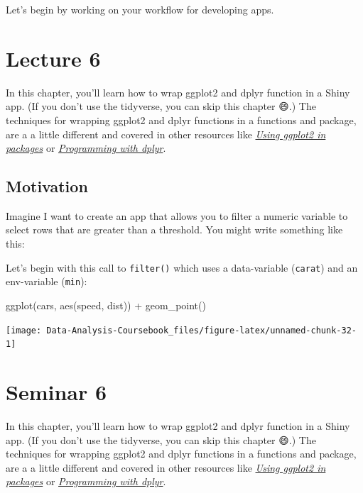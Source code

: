 \documentclass[
]{article}
\newenvironment{Shaded}{\begin{snugshade}}{\end{snugshade}}
\newcommand{\FunctionTok}[1]{\textcolor[rgb]{0.00,0.00,0.00}{#1}}
\newcommand{\NormalTok}[1]{#1}
\newcommand{\SpecialCharTok}[1]{\textcolor[rgb]{0.00,0.00,0.00}{#1}}
\begin{document}
Let's begin by working on your workflow for developing apps.

\hypertarget{lecture6}{%
\section{Lecture 6}\label{lecture6}}

In this chapter, you'll learn how to wrap ggplot2 and dplyr function in a Shiny app.
(If you don't use the tidyverse, you can skip this chapter 😄.) The techniques for wrapping ggplot2 and dplyr functions in a functions and package, are a a little different and covered in other resources like \href{http://ggplot2.tidyverse.org/dev/articles/ggplot2-in-packages.html}{\emph{Using ggplot2 in packages}} or \href{http://dplyr.tidyverse.org/articles/programming.html}{\emph{Programming with dplyr}}.

\hypertarget{tidy-motivation}{%
\subsection{Motivation}\label{tidy-motivation}}

Imagine I want to create an app that allows you to filter a numeric variable to select rows that are greater than a threshold.
You might write something like this:

Let's begin with this call to \texttt{filter()} which uses a data-variable (\texttt{carat}) and an env-variable (\texttt{min}):

\begin{Shaded}
\begin{Highlighting}[]
\FunctionTok{ggplot}\NormalTok{(cars, }\FunctionTok{aes}\NormalTok{(speed, dist)) }\SpecialCharTok{+} 
  \FunctionTok{geom\_point}\NormalTok{()}
\end{Highlighting}
\end{Shaded}

\begin{center}\texttt{[image: Data-Analysis-Coursebook\_files/figure-latex/unnamed-chunk-32-1]} \end{center}

\hypertarget{seminar6}{%
\section{Seminar 6}\label{seminar6}}

In this chapter, you'll learn how to wrap ggplot2 and dplyr function in a Shiny app.
(If you don't use the tidyverse, you can skip this chapter 😄.) The techniques for wrapping ggplot2 and dplyr functions in a functions and package, are a a little different and covered in other resources like \href{http://ggplot2.tidyverse.org/dev/articles/ggplot2-in-packages.html}{\emph{Using ggplot2 in packages}} or \href{http://dplyr.tidyverse.org/articles/programming.html}{\emph{Programming with dplyr}}.
\end{document}
